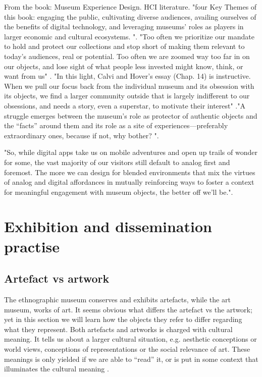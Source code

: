 From the book: Museum Experience Design. HCI literature. "four Key Themes of this book: engaging the public, cultivating diverse audiences, availing ourselves of the benefits of digital technology, and leveraging museums’ roles as players in larger economic and cultural ecosystems. "\autocite[abstract]{vermeeren_museum_2018}. "Too often we prioritize our mandate to hold and protect our collections and stop short of making them relevant to today’s audiences, real or potential. Too often we are zoomed way too far in on our objects, and lose sight of what people less invested might know, think, or want from us" \autocite[abstract]{vermeeren_museum_2018}. "In this light, Calvi and Hover’s essay (Chap. 14) is instructive. When we pull our focus back from the individual museum and its obsession with its objects, we find a larger community outside that is largely indifferent to our obsessions, and needs a story, even a superstar, to motivate their interest" \autocite[abstract]{vermeeren_museum_2018}."A struggle emerges between the museum’s role as protector of authentic objects and the “facts” around them and its role as a site of experiences—preferably extraordinary ones, because if not, why bother? "\autocite[abstract]{vermeeren_museum_2018}.

"So, while digital apps take us on mobile adventures and open up trails of wonder for some, the vast majority of our visitors still default to analog first and foremost. The more we can design for blended environments that mix the virtues of analog and digital affordances in mutually reinforcing ways to foster a context for meaningful engagement with museum objects, the better off we’ll be."\autocite[abstract]{vermeeren_museum_2018}.



\section{Exhibition and dissemination practise}

\subsection{Artefact vs artwork}
The ethnographic museum conserves and exhibits artefacts, while the art museum, works of art. It seems obvious what differs the artefact vs the artwork; yet in this section we will learn how the objects they refer to differ regarding what they represent. Both artefacts and artworks is charged with cultural meaning. It tells us about a larger cultural situation, e.g. aesthetic conceptions or world views, conceptions of representations or the social relevance of art. These meanings is only yielded if we are able to “read” it, or is put in some context that illuminates the cultural meaning \autocite[p. 206]{Thi_book}.


